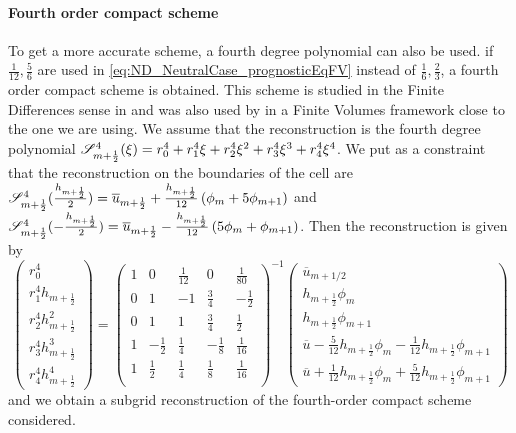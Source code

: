 \paragraph{Fourth order compact scheme}
To get a more accurate scheme,
a fourth degree polynomial can also be used.
if $\frac{1}{12}, \frac{5}{6}$ are used in
\eqref{eq:ND_NeutralCase_prognosticEqFV} instead of
$\frac{1}{6}, \frac{2}{3}$, a fourth order compact scheme
is obtained. This scheme is studied in the Finite Differences sense
in \citep{adam_highly_1977} and was also used
by \cite{piller_finite-volume_2004} in a Finite Volumes framework
close to the one we are using.
We assume that the reconstruction is the fourth degree
polynomial
${\cal S}_{m+\frac{1}{2}}^4(\xi) = r_0^4 + r_1^4 \xi + r_2^4 \xi^2 
+ r_3^4 \xi^3 + r_4^4 \xi^4$. We put as a constraint that the
reconstruction on the boundaries of the cell are
${\cal S}^4_{m+\frac{1}{2}}(\frac{h_{m+\frac{1}{2}}}{2}) =
\overline{u}_{m+\frac{1}{2}} + \frac{h_{m+\frac{1}{2}}}{12}\left(
\phi_m + 5\phi_{m+1}\right) $ and
${\cal S}^4_{m+\frac{1}{2}}(-\frac{h_{m+\frac{1}{2}}}{2}) =
\overline{u}_{m+\frac{1}{2}} - \frac{h_{m+\frac{1}{2}}}{12}\left(
5\phi_m + \phi_{m+1}\right)$.
Then the reconstruction is given by
\begin{equation}
    \begin{pmatrix}
    r_0^4 \\
    r_1^4 h_{m+\frac{1}{2}} \\
    r_2^4 h_{m+\frac{1}{2}}^2 \\
    r_3^4 h_{m+\frac{1}{2}}^3 \\
    r_4^4 h_{m+\frac{1}{2}}^4
    \end{pmatrix}
     = 
    \begin{pmatrix}
    1 & 0 & \frac{1}{12} & 0 & \frac{1}{80} \\
    0 & 1 & -1 & \frac{3}{4} & -\frac{1}{2} \\
    0 & 1 & 1 & \frac{3}{4} & \frac{1}{2} \\
    1 & -\frac{1}{2} & \frac{1}{4} & -\frac{1}{8}
    & \frac{1}{16} \\
    1 & \frac{1}{2} & \frac{1}{4} & \frac{1}{8}
    & \frac{1}{16} \\
    \end{pmatrix}^{-1}
    \begin{pmatrix}
    \overline{u}_{m+1/2} \\
    h_{m+\frac{1}{2}} \phi_m \\
	    h_{m+\frac{1}{2}} \phi_{m+1} \\
	    \overline{u} - \frac{5}{12} h_{m+\frac{1}{2}} \phi_m
	    - \frac{1}{12} h_{m+\frac{1}{2}} \phi_{m+1} \\
	    \overline{u} + \frac{1}{12} h_{m+\frac{1}{2}} \phi_m
	    + \frac{5}{12} h_{m+\frac{1}{2}} \phi_{m+1}
    \end{pmatrix}
\end{equation}
and we obtain a subgrid reconstruction of the fourth-order
compact scheme considered.


